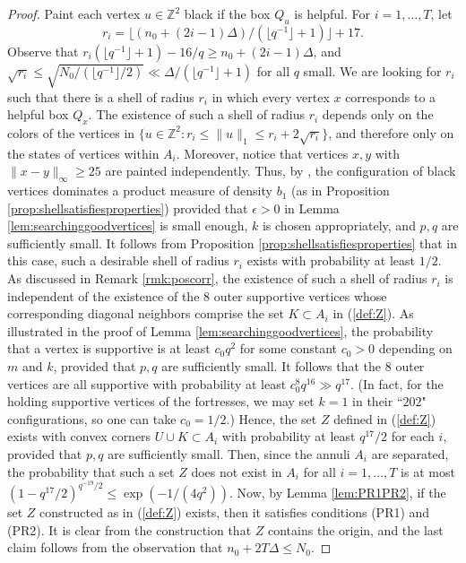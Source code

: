\documentclass{article}
\newcommand{\bZ}{{\mathbb Z}}
\numberwithin{equation}{section}
\begin{document}
\begin{proof}
    Paint each vertex $u \in \bZ^2$ black if the box $Q_u$ is helpful.
    For $i = 1,\dots, T$, let
    \[
    r_i = \lfloor (n_0 + (2i - 1)\Delta) / (\lfloor q^{-1} \rfloor + 1) \rfloor + 17.
    \]
    Observe that $r_i(\lfloor q^{-1} \rfloor + 1) - 16/q \geq n_0 + (2i - 1)\Delta$, and $\sqrt{r_i} \leq \sqrt{N_0/(\lfloor q^{-1} \rfloor /2 )} \ll \Delta / (\lfloor q^{-1} \rfloor + 1)$ for all $q$ small.
    We are looking for $r_i$ such that there is a shell of radius $r_i$ in which every vertex $x$ corresponds to a helpful box $Q_x$.
    The existence of such a shell of radius $r_i$ depends only on the colors of the vertices in $\{u \in \bZ^2 : r_i \leq \|u\|_1 \leq r_i + 2\sqrt{r_i} \}$, and therefore only on the states of vertices within $A_i$.
    Moreover, notice that vertices $x, y$ with $\|x - y\|_\infty \geq 25$ are painted independently.
    Thus, by \cite{LiggettSchonmannStacey}, the configuration of black vertices dominates a product measure of density $b_1$ (as in Proposition \ref{prop:shellsatisfiesproperties}) provided that $\epsilon > 0$ in Lemma \ref{lem:searchinggoodvertices} is small enough, $k$ is chosen appropriately, and $p, q$ are sufficiently small.
    It follows from Proposition \ref{prop:shellsatisfiesproperties} that in this case, such a desirable shell of radius $r_i$ exists with probability at least $1/2$.
    As discussed in Remark \ref{rmk:poscorr}, the existence of such a shell of radius $r_i$ is independent of the existence of the $8$ outer supportive vertices whose corresponding diagonal neighbors comprise the set $K \subset A_i$ in (\ref{def:Z}).
    As illustrated in the proof of Lemma \ref{lem:searchinggoodvertices}, the probability that a vertex is supportive is at least $c_0 q^2$ for some constant $c_0 > 0$ depending on $m$ and $k$, provided that $p, q$ are sufficiently small. 
    It follows that the $8$ outer vertices are all supportive with probability at least $c_0^{8}q^{16} \gg q^{17}$.
    (In fact, for the holding supportive vertices of the fortresses, we may set $k=1$ in their ``$202$" configurations, so one can take $c_0 = 1/2$.)
    Hence, the set $Z$ defined in (\ref{def:Z}) exists with convex corners $U \cup K \subset A_i$ with probability at least $q^{17}/2$ for each $i$, provided that $p, q$ are sufficiently small.
    Then, since the annuli $A_i$ are separated, the probability that such a set $Z$ does not exist in $A_i$ for all $i = 1,\dots, T$ is at most $(1 - q^{17}/2)^{q^{-19}/2} \leq \exp(-1/(4q^2))$.
    Now, by Lemma \ref{lem:PR1PR2}, if the set $Z$ constructed as in (\ref{def:Z}) exists, then it satisfies conditions (PR1) and (PR2).
    It is clear from the construction that $Z$ contains the origin, and the last claim follows from the observation that $n_0 + 2T\Delta \leq N_0$.
\end{proof}
\end{document}
